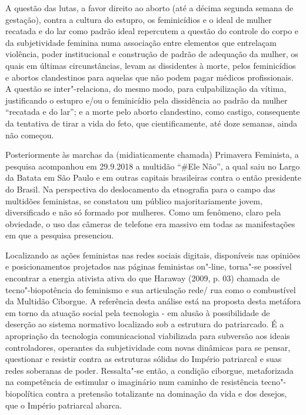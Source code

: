 A questão das lutas, a favor direito ao aborto (até a décima segunda
semana de gestação), contra a cultura do estupro, os feminicídios e o
ideal de mulher recatada e do lar como padrão ideal repercutem a questão
do controle do corpo e da subjetividade feminina numa associação entre
elementos que entrelaçam violência, poder institucional e construção de
padrão de adequação da mulher, os quais em últimas circunstâncias, levam
as dissidentes à morte, pelos feminicídios e abortos clandestinos para
aquelas que não podem pagar médicos profissionais. A questão se
inter"-relaciona, do mesmo modo, para culpabilização da vítima,
justificando o estupro e/ou o feminicídio pela dissidência ao padrão da
mulher ``recatada e do lar''; e a morte pelo aborto clandestino, como
castigo, consequente da tentativa de tirar a vida do feto, que
cientificamente, até doze semanas, ainda não começou.

Posteriormente às marchas da (midiaticamente chamada) Primavera
Feminista, a pesquisa acompanhou em 29.9.2018 a multidão ``\#Ele Não'',
a qual saiu no Largo da Batata em São Paulo e em outras capitais
brasileiras contra o então presidente do Brasil. Na perspectiva do
deslocamento da etnografia para o campo das multidões feministas, se
constatou um público majoritariamente jovem, diversificado e não só
formado por mulheres. Como um fenômeno, claro pela obviedade, o uso das
câmeras de telefone era massivo em todas as manifestações em que a
pesquisa presenciou.

Localizando as ações feministas nas redes sociais digitais, disponíveis
nas opiniões e posicionamentos projetados nas páginas feministas
on"-line, torna"-se possível encontrar a energia ativista ativa do que
Haraway (2009, p. 03) chamada de tecno"-biopotência do feminismo e sua
articulação rede/ rua como o combustível da Multidão Ciborgue. A
referência desta análise está na proposta desta metáfora em torno da
atuação social pela tecnologia - em alusão à possibilidade de deserção
ao sistema normativo localizado sob a estrutura do patriarcado. É a
apropriação da tecnologia comunicacional viabilizada para subversão aos
ideais controladores, operantes da subjetividade com novas dinâmicas
para se pensar, questionar e resistir contra as estruturas sólidas do
Império patriarcal e suas redes soberanas de poder. Ressalta"-se então, a
condição ciborgue, metaforizada na competência de estimular o imaginário
num caminho de resistência tecno"-biopolítica contra a pretensão
totalizante na dominação da vida e dos desejos, que o Império patriarcal
abarca.


